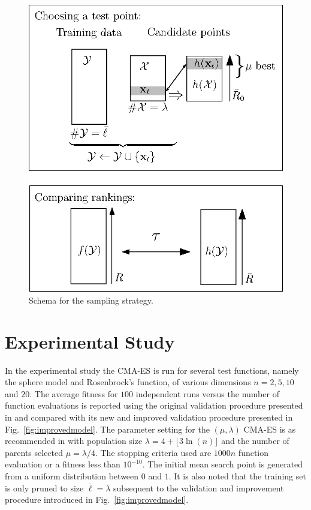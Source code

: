 \documentclass[conference]{IEEEtran}
\begin{document}
\begin{figure}[t!]
\centering \includegraphics[width=0.7\columnwidth]{figs/schema.eps}
\caption{Schema for the sampling strategy.}\label{fig:schema} 
\end{figure}

\section{Experimental Study}\label{sec:Experiment}
In the experimental study the CMA-ES is run for several test functions, namely the sphere model and Rosenbrock's function, of various dimensions $n=2,5,10$ and $20$. The average fitness for $100$ independent runs versus the number of function evaluations is reported using the original validation procedure presented in \cite{Ru06:PPSN} and compared with its new and improved validation procedure presented in Fig.~\ref{fig:improvedmodel}. %
The parameter setting for the $(\mu,\lambda)$ CMA-ES is as recommended in \cite{hansen:ostermeier:01} with population size $\lambda = 4+\lfloor 3\ln(n)\rfloor$ and the number of parents selected $\mu=\lambda/4$. The stopping criteria used are $1000n$ function evaluation or a fitness less than $10^{-10}$. The initial mean search point is generated from a uniform distribution between $0$ and $1$. It is also noted that the training set is only pruned to size $\overline{\ell} = \lambda$ subsequent to the validation and improvement procedure introduced in Fig.~\ref{fig:improvedmodel}. 
\end{document}
